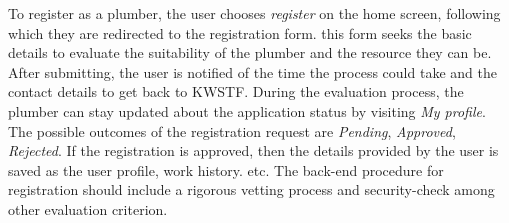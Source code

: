 \documentclass{article}
\begin{document}
To register as a plumber, the user chooses {\it register} on the home screen, following which they are redirected to the registration form. this form seeks the basic details to evaluate the suitability of the plumber and the resource they can be. After submitting, the user is notified of the time the process could take and the contact details to get back to KWSTF. During the evaluation process, the plumber can stay updated
about the application status by visiting {\it My profile}. The possible outcomes of the registration request 
are {\it Pending}, {\it Approved}, {\it Rejected}. If the registration is approved, then the details provided by the user is saved as the user profile, work history. etc. The back-end procedure for registration should 
include a rigorous vetting process and security-check among other evaluation criterion. 
\end{document}
